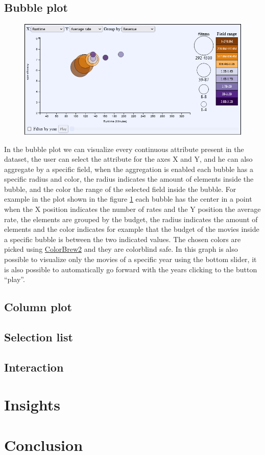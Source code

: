 \documentclass[]{article}
\newcommand{\quotes}[1]{``#1''}
\begin{document}
\subsection{Bubble plot}
\begin{figure}[h!]
	\centering
	\includegraphics[width=1\linewidth]{images/bubble_plot}
	\caption[Bubble plot]{}
	\label{fig:bubbleplot}
\end{figure}
In the bubble plot we can visualize every continuous attribute present in the dataset, the user can select the attribute for the axes X and Y, and he can also aggregate by a specific field, when the aggregation is enabled each bubble has a specific radius and color, the radius indicates the amount of elements inside the bubble, and the color the range of the selected field inside the bubble.
For example in the plot shown in the figure \ref{fig:bubbleplot} each bubble has the center in a point when the X position indicates the number of rates and the Y position the average rate, the elements are grouped by the budget, the radius indicates the amount of elements and the color indicates for example that the budget of the movies inside a specific bubble is between the two indicated values.\newline
The chosen colors are picked using \href{https://colorbrewer2.or}{ColorBrew2} and they are colorblind safe.\newline
In this graph is also possible to visualize only the movies of a specific year using the bottom slider, it is also possible to automatically go forward with the years clicking to the button \quotes{play}.
\subsection{Column plot}
\subsection{Selection list}
\subsection{Interaction}
\section{Insights}
\section{Conclusion}
\end{document}
